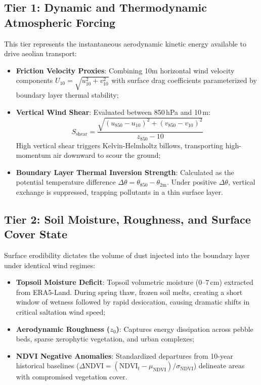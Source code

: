 \subsection{Tier 1: Dynamic and Thermodynamic Atmospheric Forcing}
\label{subsec:tier1_dynamics}

This tier represents the instantaneous aerodynamic kinetic energy available to drive aeolian transport:
\begin{itemize}
    \item \textbf{Friction Velocity Proxies}: Combining 10m horizontal wind velocity components $U_{10} = \sqrt{u_{10}^2 + v_{10}^2}$ with surface drag coefficients parameterized by boundary layer thermal stability;
    \item \textbf{Vertical Wind Shear}: Evaluated between 850\,hPa and 10\,m:
    \begin{equation}
    \label{eq:wind_shear}
    S_{\text{shear}} = \frac{\sqrt{(u_{850} - u_{10})^2 + (v_{850} - v_{10})^2}}{z_{850} - 10}
    \end{equation}
    High vertical shear triggers Kelvin-Helmholtz billows, transporting high-momentum air downward to scour the ground;
    \item \textbf{Boundary Layer Thermal Inversion Strength}: Calculated as the potential temperature difference $\Delta \theta = \theta_{850} - \theta_{2\text{m}}$. Under positive $\Delta \theta$, vertical exchange is suppressed, trapping pollutants in a thin surface layer.
\end{itemize}

\subsection{Tier 2: Soil Moisture, Roughness, and Surface Cover State}
\label{subsec:tier2_surface}

Surface erodibility dictates the volume of dust injected into the boundary layer under identical wind regimes:
\begin{itemize}
    \item \textbf{Topsoil Moisture Deficit}: Topsoil volumetric moisture ($0\text{--}7\,\text{cm}$) extracted from ERA5-Land. During spring thaw, frozen soil melts, creating a short window of wetness followed by rapid desiccation, causing dramatic shifts in critical saltation wind speed;
    \item \textbf{Aerodynamic Roughness ($z_0$)}: Captures energy dissipation across pebble beds, sparse xerophytic vegetation, and urban complexes;
    \item \textbf{NDVI Negative Anomalies}: Standardized departures from 10-year historical baselines ($\Delta \text{NDVI} = (\text{NDVI}_t - \mu_{\text{NDVI}}) / \sigma_{\text{NDVI}}$) delineate areas with compromised vegetation cover.
\end{itemize}

